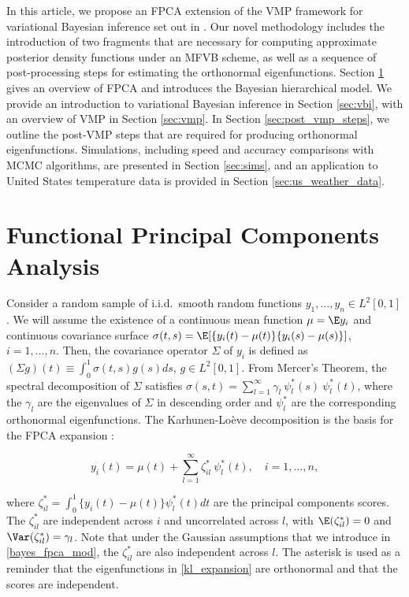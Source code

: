 \documentclass[12pt]{article}
\theoremstyle{plain}
\theoremstyle{definition}
\theoremstyle{remark}
\begin{document}
In this article, we propose an FPCA extension of the VMP framework for variational Bayesian inference set out in
. Our novel methodology includes the introduction of two fragments  that are necessary for
computing approximate posterior density functions under an MFVB scheme,
as well as a sequence of post-processing steps for estimating the orthonormal eigenfunctions.
Section \ref{sec:fpca} gives an overview of FPCA and
introduces the Bayesian hierarchical model.
We provide an introduction to
variational Bayesian inference in Section \ref{sec:vbi}, with an overview of VMP in Section \ref{sec:vmp}.
In Section \ref{sec:post_vmp_steps}, we outline the post-VMP steps that are required for
producing orthonormal eigenfunctions. Simulations, including speed and accuracy comparisons with MCMC
algorithms, are presented in Section \ref{sec:sims}, and an application to United States temperature data is
provided in Section \ref{sec:us_weather_data}.


\section{Functional Principal Components Analysis}
\label{sec:fpca}

Consider a random sample of i.i.d.\ smooth random functions $y_1, \dots, y_n \in L^2 [0, 1]$. We will assume the
existence of a continuous mean function $\mu = \E y_i$ and continuous covariance surface
$\sigma (t, s) = \E [ \{ y_i (t) - \mu (t) \} \{ y_i (s) - \mu (s) \} ]$, $i = 1, \dots, n$.
Then, the covariance operator $\Sigma$ of $y_i$ is defined as $(\Sigma g) (t) \equiv \int_0^1 \sigma (t, s) g(s) ds$, 
$g \in L^2 [0, 1]$. From Mercer's Theorem, the spectral decomposition of $\Sigma$ satisfies $\sigma (s, t) =
\sum_{l=1}^\infty \gamma_l \ \psi^*_l (s) \ \psi^*_l (t)$, where the $\gamma_l$ are the eigenvalues of
$\Sigma$ in descending
order and $\psi^*_l$ are the corresponding orthonormal eigenfunctions. The Karhunen-Lo\`{e}ve decomposition
is the basis for the FPCA expansion \cite{yao05}:

\begin{equation}
	y_i (t) = \mu (t) + \sum_{l=1}^\infty \zeta^*_{il} \ \psi^*_l (t), \quad i = 1, \dots, n,
\label{kl_expansion}
\end{equation}

\noindent where $\zeta^*_{il} = \int_0^1 \{ y_i (t) - \mu(t) \} \psi^*_l(t) dt$ are the principal components
scores. The $\zeta^*_{il}$ are independent across $i$ and uncorrelated across $l$, with $\E (\zeta^*_{il}) = 0$
and $\Var (\zeta^*_{il}) = \gamma_l$. Note that under the Gaussian assumptions that we introduce  in
\eqref{bayes_fpca_mod}, the $\zeta^*_{il}$ are also independent across $l$.
The asterisk is used as a reminder that the eigenfunctions in
\eqref{kl_expansion} are orthonormal and that the scores are independent.
\end{document}
